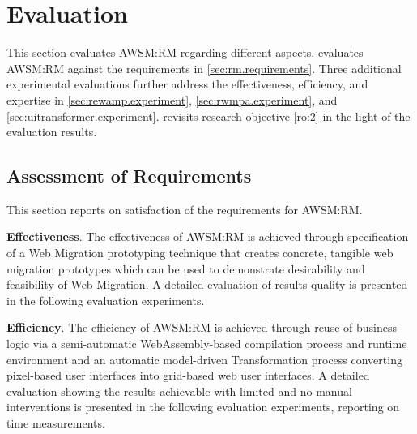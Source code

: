 \vspace{-15pt}
\hypertarget{sec:rm.evaluation}{%
\section{Evaluation}\label{sec:rm.evaluation}}
\vspace{15pt}

This section evaluates AWSM:RM regarding different aspects.
 evaluates AWSM:RM against the requirements in \cref{sec:rm.requirements}.
Three additional experimental evaluations further address the effectiveness, efficiency, and expertise in \cref{sec:rewamp.experiment}, \cref{sec:rwmpa.experiment}, and \cref{sec:uitransformer.experiment}.
 revisits research objective \cref{ro:2} in the light of the evaluation results.

\hypertarget{sec:rm.evaluation.req}{%
\subsection{Assessment of Requirements}\label{sec:rm.evaluation.req}}
\vspace{10pt}

This section reports on satisfaction of the requirements for AWSM:RM.

\textbf{Effectiveness}.
The effectiveness of AWSM:RM is achieved through specification of a \gls{Web Migration} prototyping technique that creates concrete, tangible \glspl{web migration prototype} which can be used to demonstrate desirability and feasibility of \gls{Web Migration}.
A detailed evaluation of results quality is presented in the following evaluation experiments.

\vspace{-10pt}
\textbf{Efficiency}.
The efficiency of AWSM:RM is achieved through reuse of business logic via a semi-automatic WebAssembly-based compilation process and runtime environment and an automatic model-driven \gls{Transformation} process converting  pixel-based user interfaces into grid-based \gls{web} user interfaces.
A detailed evaluation showing the results achievable with limited and no manual interventions is presented in the following evaluation experiments, reporting on time measurements.

